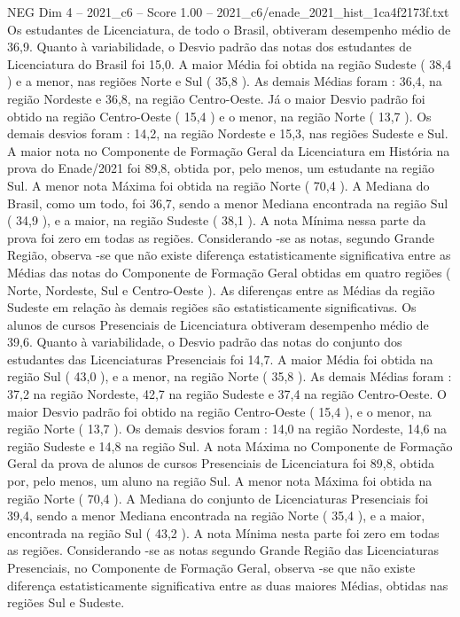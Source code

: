 \begin{textsample}{NEG Dim 4 – 2021\_c6 – Score 1.00 – 2021\_c6/enade\_2021\_hist\_1ca4f2173f.txt}
Os estudantes de Licenciatura, de todo o Brasil, obtiveram desempenho médio de 36,9.
Quanto à variabilidade, o Desvio padrão das notas dos estudantes de Licenciatura do Brasil foi 15,0.
A maior Média foi obtida na região Sudeste ( 38,4 ) e a menor, nas regiões Norte e Sul ( 35,8 ).
As demais Médias foram : 36,4, na região Nordeste e 36,8, na região Centro-Oeste.
Já o maior Desvio padrão foi obtido na região Centro-Oeste ( 15,4 ) e o menor, na região Norte ( 13,7 ).
Os demais desvios foram : 14,2, na região Nordeste e 15,3, nas regiões Sudeste e Sul.
A maior nota no Componente de Formação Geral da Licenciatura em História na prova do Enade/2021 foi 89,8, obtida por, pelo menos, um estudante na região Sul.
A menor nota Máxima foi obtida na região Norte ( 70,4 ).
A Mediana do Brasil, como um todo, foi 36,7, sendo a menor Mediana encontrada na região Sul ( 34,9 ), e a maior, na região Sudeste ( 38,1 ).
A nota Mínima nessa parte da prova foi zero em todas as regiões.
Considerando -se as notas, segundo Grande Região, observa -se que não existe diferença estatisticamente significativa entre as Médias das notas do Componente de Formação Geral obtidas em quatro regiões ( Norte, Nordeste, Sul e Centro-Oeste ).
As diferenças entre as Médias da região Sudeste em relação às demais regiões são estatisticamente significativas.
Os alunos de cursos Presenciais de Licenciatura obtiveram desempenho médio de 39,6.
Quanto à variabilidade, o Desvio padrão das notas do conjunto dos estudantes das Licenciaturas Presenciais foi 14,7.
A maior Média foi obtida na região Sul ( 43,0 ), e a menor, na região Norte ( 35,8 ).
As demais Médias foram : 37,2 na região Nordeste, 42,7 na região Sudeste e 37,4 na região Centro-Oeste.
O maior Desvio padrão foi obtido na região Centro-Oeste ( 15,4 ), e o menor, na região Norte ( 13,7 ).
Os demais desvios foram : 14,0 na região Nordeste, 14,6 na região Sudeste e 14,8 na região Sul.
A nota Máxima no Componente de Formação Geral da prova de alunos de cursos Presenciais de Licenciatura foi 89,8, obtida por, pelo menos, um aluno na região Sul.
A menor nota Máxima foi obtida na região Norte ( 70,4 ).
A Mediana do conjunto de Licenciaturas Presenciais foi 39,4, sendo a menor Mediana encontrada na região Norte ( 35,4 ), e a maior, encontrada na região Sul ( 43,2 ).
A nota Mínima nesta parte foi zero em todas as regiões.
Considerando -se as notas segundo Grande Região das Licenciaturas Presenciais, no Componente de Formação Geral, observa -se que não existe diferença estatisticamente significativa entre as duas maiores Médias, obtidas nas regiões Sul e Sudeste.

\end{textsample}
